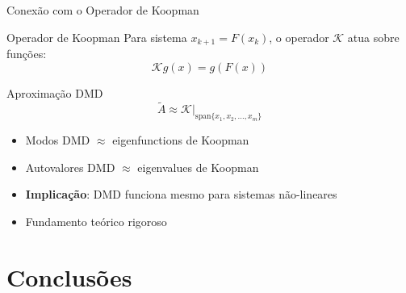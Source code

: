 \documentclass[aspectratio=169]{beamer}
\begin{document}
\begin{frame}{Conexão com o Operador de Koopman}
    \begin{block}{Operador de Koopman}
        Para sistema $x_{k+1} = F(x_k)$, o operador $\mathcal{K}$ atua sobre funções:
        \begin{equation}
            \mathcal{K}g(x) = g(F(x))
        \end{equation}
    \end{block}
    
    \begin{block}{Aproximação DMD}
        \begin{equation}
            \tilde{A} \approx \mathcal{K}|_{\text{span}\{x_1, x_2, \ldots, x_m\}}
        \end{equation}
    \end{block}
    
    \begin{itemize}
        \item Modos DMD $\approx$ eigenfunctions de Koopman
        \item Autovalores DMD $\approx$ eigenvalues de Koopman
        \item \textbf{Implicação}: DMD funciona mesmo para sistemas não-lineares
        \item Fundamento teórico rigoroso
    \end{itemize}
\end{frame}

\section{Conclusões}
\end{document}
